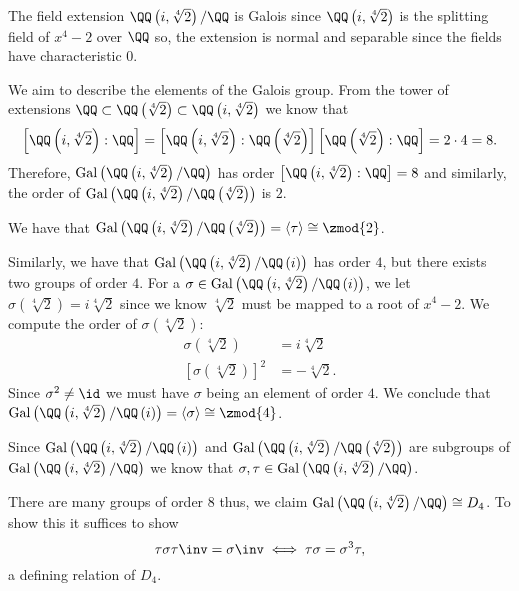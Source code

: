 \documentclass[12pt, a4paper]{article}
\newcommand{\gal}{\text{Gal}}
\begin{document}
\begin{mdexample}
    The field extension \(\QQ\left( i,\sqrt[4]{2} \right)/\QQ\) is Galois since \(\QQ\left( i,\sqrt[4]{2} \right)\) is the splitting field of \(x^4-2\) over \(\QQ\) so, the extension is normal and separable since the fields have characteristic \(0\). 
    
    We aim to describe the elements of the Galois group. From the tower of extensions \(\QQ \subset \QQ\left(\sqrt[4]{2}\right) \subset \QQ\left( i,\sqrt[4]{2} \right)\) we know that 
    \[\left[ \QQ\left( i,\sqrt[4]{2} \right):\QQ \right]=\left[ \QQ\left( i,\sqrt[4]{2} \right):\QQ\left( \sqrt[4]{2} \right) \right] \left[ \QQ\left( \sqrt[4]{2} \right):\QQ \right] = 2\cdot 4 = 8.\]
    Therefore, \(\gal\left( \QQ\left( i,\sqrt[4]{2} \right)/\QQ \right)\) has order \(\left[ \QQ\left( i,\sqrt[4]{2} \right):\QQ \right] = 8\) and similarly, the order of \(\gal\left( \QQ\left( i,\sqrt[4]{2} \right)/\QQ\left( \sqrt[4]{2} \right) \right)\) is \(2\).

    We have that \(\gal\left( \QQ\left( i,\sqrt[4]{2} \right)/\QQ\left( \sqrt[4]{2} \right) \right) = \langle \tau \rangle \cong \zmod{2}\).

    Similarly, we have that \(\gal\left( \QQ\left( i,\sqrt[4]{2} \right)/\QQ\left(i\right) \right)\) has order \(4\), but there exists two groups of order \(4\). For a \(\sigma \in \gal\left( \QQ\left( i,\sqrt[4]{2} \right)/\QQ\left(i\right) \right)\), we let \(\sigma \left( \sqrt[4]{2} \right) = i\sqrt[4]{2}\) since we know \(\sqrt[4]{2}\) must be mapped to a root of \(x^4-2\). We compute the order of \(\sigma \left( \sqrt[4]{2} \right)\): 
    \[\begin{aligned}
        \sigma \left( \sqrt[4]{2} \right) &= i\sqrt[4]{2} \\
        \left[ \sigma \left( \sqrt[4]{2} \right) \right]^2 &= -\sqrt[4]{2}.
    \end{aligned}\]
    Since \(\sigma^2 \neq \id\) we must have \(\sigma\) being an element of order \(4\). We conclude that \(\gal\left( \QQ\left( i,\sqrt[4]{2} \right)/\QQ\left(i\right) \right)=\langle \sigma \rangle \cong \zmod{4}\). 

    Since \(\gal\left( \QQ\left( i,\sqrt[4]{2} \right)/\QQ\left(i\right) \right)\) and \(\gal\left( \QQ\left( i,\sqrt[4]{2} \right)/\QQ\left( \sqrt[4]{2} \right) \right)\) are subgroups of\\ \(\gal\left( \QQ\left( i,\sqrt[4]{2} \right)/\QQ \right)\) we know that \(\sigma,\tau \in \gal\left( \QQ\left( i,\sqrt[4]{2} \right)/\QQ \right)\).

    There are many groups of order \(8\) thus, we claim \(\gal\left( \QQ\left( i,\sqrt[4]{2} \right)/\QQ \right) \cong D_4\). To show this it suffices to show
    \[\tau \sigma \tau\inv =\sigma\inv\iff \tau\sigma=\sigma^3\tau,\]
    a defining relation of \(D_4\).
\end{mdexample}
\end{document}
